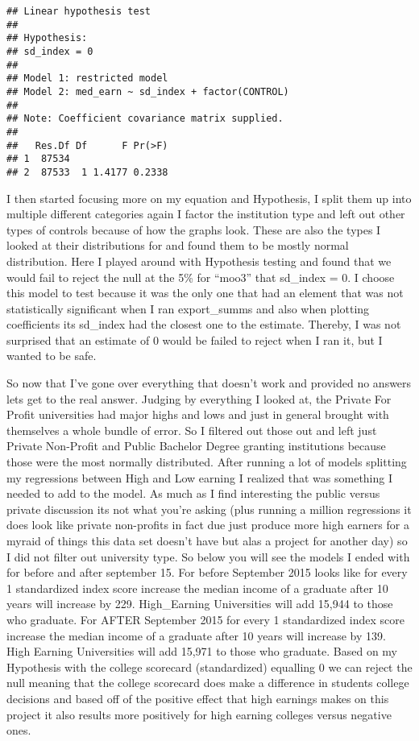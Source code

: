 \documentclass[
]{article}
\begin{document}
\begin{verbatim}
## Linear hypothesis test
## 
## Hypothesis:
## sd_index = 0
## 
## Model 1: restricted model
## Model 2: med_earn ~ sd_index + factor(CONTROL)
## 
## Note: Coefficient covariance matrix supplied.
## 
##   Res.Df Df      F Pr(>F)
## 1  87534                 
## 2  87533  1 1.4177 0.2338
\end{verbatim}

I then started focusing more on my equation and Hypothesis, I split them
up into multiple different categories again I factor the institution
type and left out other types of controls because of how the graphs
look. These are also the types I looked at their distributions for and
found them to be mostly normal distribution. Here I played around with
Hypothesis testing and found that we would fail to reject the null at
the 5\% for ``moo3'' that sd\_index = 0. I choose this model to test
because it was the only one that had an element that was not
statistically significant when I ran export\_summs and also when
plotting coefficients its sd\_index had the closest one to the estimate.
Thereby, I was not surprised that an estimate of 0 would be failed to
reject when I ran it, but I wanted to be safe.

So now that I've gone over everything that doesn't work and provided no
answers lets get to the real answer. Judging by everything I looked at,
the Private For Profit universities had major highs and lows and just in
general brought with themselves a whole bundle of error. So I filtered
out those out and left just Private Non-Profit and Public Bachelor
Degree granting institutions because those were the most normally
distributed. After running a lot of models splitting my regressions
between High and Low earning I realized that was something I needed to
add to the model. As much as I find interesting the public versus
private discussion its not what you're asking (plus running a million
regressions it does look like private non-profits in fact due just
produce more high earners for a myraid of things this data set doesn't
have but alas a project for another day) so I did not filter out
university type. So below you will see the models I ended with for
before and after september 15. For before September 2015 looks like for
every 1 standardized index score increase the median income of a
graduate after 10 years will increase by 229. High\_Earning Universities
will add 15,944 to those who graduate. For AFTER September 2015 for
every 1 standardized index score increase the median income of a
graduate after 10 years will increase by 139. High Earning Universities
will add 15,971 to those who graduate. Based on my Hypothesis with the
college scorecard (standardized) equalling 0 we can reject the null
meaning that the college scorecard does make a difference in students
college decisions and based off of the positive effect that high
earnings makes on this project it also results more positively for high
earning colleges versus negative ones.
\end{document}
